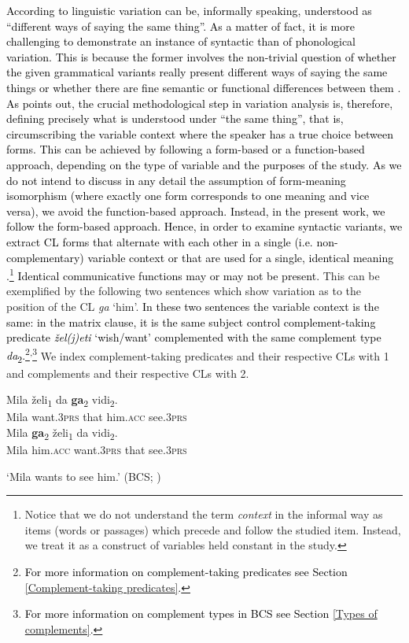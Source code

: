 \textcolor{black}{According to \citet[440]{Walker13}  linguistic variation can be, informally speaking, understood as ``different ways of saying the same thing''. 
As a matter of fact, it is more challenging to demonstrate an instance of syntactic than of phonological variation. This is because the former involves the non-trivial question of whether the given grammatical variants really present different ways of saying the same things or whether there are fine semantic or functional differences between them \citep[441]{Walker13}.
As \citet[442]{Walker13} points out, the crucial methodological step in variation analysis is, therefore, defining precisely what is understood under “the same thing”, that is, circumscribing the variable context where the speaker has a true choice between forms. 
This can be achieved by following a form-based or a function-based approach, depending on the type of variable and the purposes of the study. As we do not intend to discuss in any detail the assumption of form-meaning isomorphism (where exactly one form corresponds to one meaning and vice versa), we avoid  the function-based approach. Instead, in the present work, we follow the form-based approach. Hence, in order to examine syntactic variants, we extract CL forms that alternate with each other in a single (i.e. non-complementary) variable context or that are used for a single, identical meaning \citep[443]{Walker13}.\footnote{Notice that we do not understand the term \textit{context} in the informal way as items (words or passages) which precede and follow the studied item. Instead, we treat it as a construct of variables held constant in the study.} Identical communicative functions may or may not be present.}
 This can be exemplified by the following two sentences which show variation as to the position of the CL \textit{ga} `him'. \textcolor{black}{In these two sentences the variable context is the same: in the matrix clause, it is the same subject control complement-taking predicate \textit{žel(j)eti} `wish/want' complemented with the same complement type \textit{da}\textsubscript{2}.}\footnote{\textcolor{black}{For more information on complement-taking predicates see Section \ref{Complement-taking predicates}.}}\textsuperscript{,}\footnote{\textcolor{black}{For more information on complement types in BCS see Section \ref{Types of complements}.}} We index complement-taking predicates and their respective CLs with 1 and complements and their respective CLs with 2. 

\begin{exe}\ex
\begin{xlist}
\ex \label{(2.4a)}
\gll Mila želi\textsubscript{1} da \textbf{ga}\textsubscript{2} vidi\textsubscript{2}.\\
 Mila want\textsc{.3prs} that him\textsc{.acc} see\textsc{.3prs}\\
\ex \label{(2.4b)}
\gll Mila \textbf{ga}\textsubscript{2} želi\textsubscript{1} da vidi\textsubscript{2}.\\
 Mila him\textsc{.acc} want\textsc{.3prs} that see\textsc{.3prs}\\
\end{xlist}
\glt `Mila wants to see him.'
\hfill (BCS; \citealt[11]{Aljovic05})
\end{exe}

